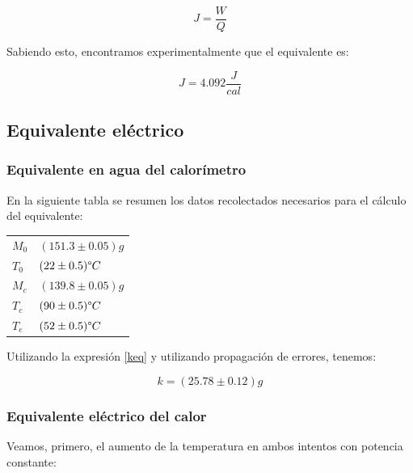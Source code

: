 \documentclass{article}
\begin{document}
\begin{equation}
    J = \frac{W}{Q}
    \label{eqivmec}
\end{equation}

Sabiendo esto, encontramos experimentalmente que el equivalente es:

\begin{equation*}
    J = 4.092 \frac{J}{cal}
\end{equation*}

\subsection{Equivalente eléctrico}
\subsubsection{Equivalente en agua del calorímetro}
En la siguiente tabla se resumen los datos recolectados necesarios para el cálculo del equivalente:

\begin{table}[H]
\centering
\begin{tabular}{l|l}
$M_0$ & $(151.3 \pm 0.05)g$ \\
$T_0$ & $(22 \pm 0.5) \degree C$    \\
$M_c$ & $(139.8 \pm 0.05)g$ \\
$T_c$ & $(90 \pm 0.5) \degree C$    \\
$T_e$ & $(52 \pm 0.5) \degree C$    \\
\end{tabular}
\end{table}

Utilizando la expresión \ref{keq} y utilizando propagación de errores, tenemos:

\begin{equation*}
    k = (25.78 \pm 0.12) g
\end{equation*}

\subsubsection{Equivalente eléctrico del calor}
Veamos, primero, el aumento de la temperatura en ambos intentos con potencia constante:
\end{document}
